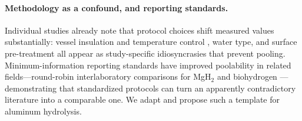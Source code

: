 \paragraph{Methodology as a confound, and reporting standards.}
Individual studies already note that protocol choices shift measured values substantially:
vessel insulation and temperature control \citep{urbonavicius2023}, water type, and
surface pre-treatment \citep{wen2018} all appear as study-specific idiosyncrasies that
prevent pooling. Minimum-information reporting standards have improved poolability in
related fields---round-robin interlaboratory comparisons for MgH$_2$
\citep{wulf2021} and biohydrogen \citep{hoque2018}---demonstrating that standardized
protocols can turn an apparently contradictory literature into a comparable one. We adapt
and propose such a template for aluminum hydrolysis.
